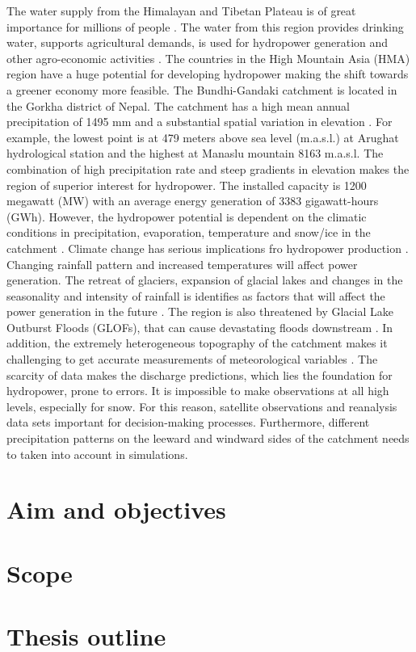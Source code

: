 The water supply from the Himalayan and Tibetan Plateau is of great importance for 
millions of people \parencite{bookhagen_toward_2010}. The water from this region provides drinking water, 
supports agricultural demands, is used for hydropower generation and other agro-economic 
activities \parencite{hess-17-3921-2013}. The countries in the High Mountain Asia (HMA) 
region have a huge potential for developing hydropower making the shift towards a greener 
economy more feasible. The Bundhi-Gandaki catchment is located in the Gorkha district of Nepal. 
The catchment has a high mean annual precipitation of 1495 mm and a substantial spatial variation in 
elevation \parencite{devkota_climate_2017}. For example, the lowest point is at 479 meters above sea 
level (m.a.s.l.) at Arughat hydrological station and the highest at Manaslu mountain 8163 m.a.s.l. The 
combination of high precipitation rate and steep gradients in elevation makes the region of superior 
interest for hydropower. The installed capacity is 1200 megawatt (MW) with an average energy generation 
of 3383 gigawatt-hours (GWh). However, the hydropower potential is dependent on the climatic conditions 
in precipitation, evaporation, temperature and snow/ice in the catchment \parencite{edenhofer2011renewable}. 
Climate change has serious implications fro hydropower production \parencite{dandekhya_gandaki_2017}. 
Changing rainfall pattern and increased temperatures will affect power generation. The retreat of 
glaciers, expansion of glacial lakes and changes in the seasonality and intensity of rainfall is 
identifies as factors that will affect the power generation in the future \parencite{dandekhya_gandaki_2017}.
The region is also threatened by Glacial Lake Outburst Floods (GLOFs), that can cause devastating floods 
downstream \parencite{dandekhya_gandaki_2017}. In addition, the extremely heterogeneous topography of the 
catchment makes it challenging to get accurate measurements of meteorological 
variables \parencite{pellicciotti_12}. The scarcity of data makes the discharge predictions, 
which lies the foundation for hydropower, prone to errors. It is impossible to make observations at 
all high levels, especially for snow. For this reason, satellite observations and reanalysis data sets 
important for decision-making processes. Furthermore, different precipitation patterns on the leeward and 
windward sides of the catchment needs to taken into account in simulations.


\section{Aim and objectives}

\section{Scope}

\section{Thesis outline}